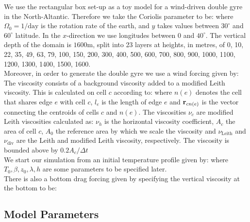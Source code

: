 We use the rectangular box set-up as a toy model for a wind-driven double gyre in the North-Altantic. Therefore we take the Coriolis parameter to be:
where $\Omega_{0} = 1/\text{day}$ is the rotation rate of the earth, and $y$ takes values between $30^\circ$ and $60^\circ$ latitude. In the $x$-direction we use longitudes between $0$ and $40^\circ$. The vertical depth of the domain is $1600\text{m}$, split into 23 layers at heights, in metres, of 0, 10, 22, 35, 49, 63, 79, 100, 150, 200, 300, 400, 500, 600, 700, 800, 900, 1000, 1100, 1200, 1300, 1400, 1500, 1600. \\
\linebreak 
Moreover, in order to generate the double gyre we use a wind forcing given by:
The viscosity consists of a background viscosity added to a modified Leith viscosity. This is calculated on cell $c$ according to:
where $n(e)$ denotes the cell that shares edge $e$ with cell $c$, $l_{e}$ is the length of edge $e$ and $\mathbf{r}_{c n(e)}$ is the vector connecting the centroids of cells $c$ and $n(e)$. The viscosities $\nu_{c}$ are modified Leith viscosities calculated as:
$\nu_{h}$ is the horizontal viscosity coefficient, $A_{c}$ the area of cell $c$, $A_{0}$ the reference area by which we scale the viscosity and $\nu_{\text{Leith}}$ and $\nu_{\text{div}}$ are the Leith and modified Leith viscosity, respectively. The viscosity is bounded above by $0.2A_{c}/\Delta t$\\
\linebreak
We start our simulation from an initial temperature profile given by:
where $T_{0},\beta,z_{0},\lambda,h$ are some parameters to be specified later. \\
\linebreak
There is also a bottom drag forcing given by specifying the vertical viscosity at the bottom to be:
\subsection{Model Parameters} \label{sec:fesomparams}

